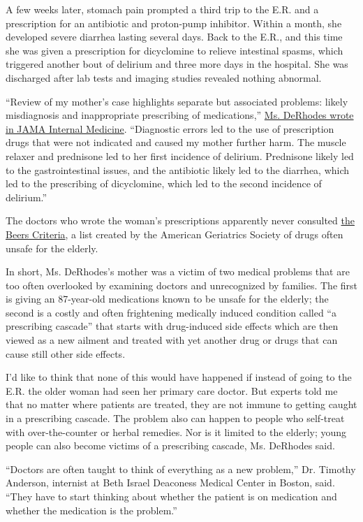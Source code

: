 A few weeks later, stomach pain prompted a third trip to the E.R. and a
prescription for an antibiotic and proton-pump inhibitor. Within a
month, she developed severe diarrhea lasting several days. Back to the
E.R., and this time she was given a prescription for dicyclomine to
relieve intestinal spasms, which triggered another bout of delirium and
three more days in the hospital. She was discharged after lab tests and
imaging studies revealed nothing abnormal.

``Review of my mother's case highlights separate but associated
problems: likely misdiagnosis and inappropriate prescribing of
medications,''
\href{https://jamanetwork.com/journals/jamainternalmedicine/article-abstract/2732693}{Ms.
DeRhodes wrote in JAMA Internal Medicine}. ``Diagnostic errors led to
the use of prescription drugs that were not indicated and caused my
mother further harm. The muscle relaxer and prednisone led to her first
incidence of delirium. Prednisone likely led to the gastrointestinal
issues, and the antibiotic likely led to the diarrhea, which led to the
prescribing of dicyclomine, which led to the second incidence of
delirium.''

The doctors who wrote the woman's prescriptions apparently never
consulted \href{https://www.aafp.org/afp/2020/0101/p56.html}{the Beers
Criteria}, a list created by the American Geriatrics Society of drugs
often unsafe for the elderly.

In short, Ms. DeRhodes's mother was a victim of two medical problems
that are too often overlooked by examining doctors and unrecognized by
families. The first is giving an 87-year-old medications known to be
unsafe for the elderly; the second is a costly and often frightening
medically induced condition called ``a prescribing cascade'' that starts
with drug-induced side effects which are then viewed as a new ailment
and treated with yet another drug or drugs that can cause still other
side effects.

I'd like to think that none of this would have happened if instead of
going to the E.R. the older woman had seen her primary care doctor. But
experts told me that no matter where patients are treated, they are not
immune to getting caught in a prescribing cascade. The problem also can
happen to people who self-treat with over-the-counter or herbal
remedies. Nor is it limited to the elderly; young people can also become
victims of a prescribing cascade, Ms. DeRhodes said.

``Doctors are often taught to think of everything as a new problem,''
Dr. Timothy Anderson, internist at Beth Israel Deaconess Medical Center
in Boston, said. ``They have to start thinking about whether the patient
is on medication and whether the medication is the problem.''

